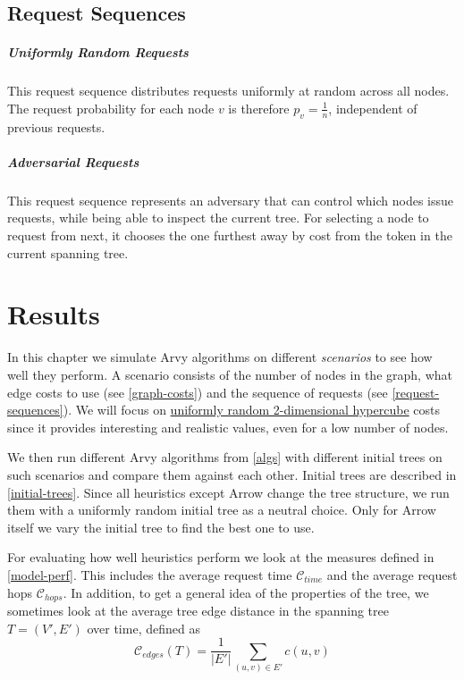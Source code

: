 \documentclass[a4paper, oneside]{discothesis}
\begin{document}
\section{Request Sequences}
\label{request-sequences}

\paragraph{Uniformly Random Requests}\label{req:random} This request sequence distributes requests uniformly at random across all nodes. The request probability for each node $v$ is therefore $p_v=\frac{1}{n}$, independent of previous requests.

\paragraph{Adversarial Requests}\label{req:adversary} This request sequence represents an adversary that can control which nodes issue requests, while being able to inspect the current tree. For selecting a node to request from next, it chooses the one furthest away by cost from the token in the current spanning tree.

\chapter{Results}

In this chapter we simulate Arvy algorithms on different \textit{scenarios} to see how well they perform. A scenario consists of the number of nodes in the graph, what edge costs to use (see \autoref{graph-costs}) and the sequence of requests (see \autoref{request-sequences}). We will focus on \hyperref[costs:cube]{uniformly random 2-dimensional hypercube} costs since it provides interesting and realistic values, even for a low number of nodes.

We then run different Arvy algorithms from \autoref{algs} with different initial trees on such scenarios and compare them against each other. Initial trees are described in \autoref{initial-trees}. Since all heuristics except Arrow change the tree structure, we run them with a uniformly random initial tree as a neutral choice. Only for Arrow itself we vary the initial tree to find the best one to use.

For evaluating how well heuristics perform we look at the measures defined in \autoref{model-perf}. This includes the average request time $\mathcal{C}_{time}$ and the average request hops $\mathcal{C}_{hops}$. In addition, to get a general idea of the properties of the tree, we sometimes look at the average tree edge distance in the spanning tree $T=(V',E')$ over time, defined as
\begin{equation}
\mathcal{C}_{edges}(T)=\frac{1}{|E'|}\sum_{(u,v)\in E'}c(u,v)
\end{equation}
\end{document}
